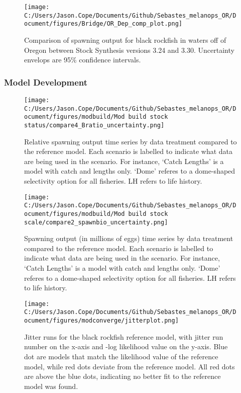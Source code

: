 \documentclass[11pt,
  english,
  letterpaper,
]{article}
\begin{document}
\newpage

\begin{figure}
\centering
\texttt{[image: C:/Users/Jason.Cope/Documents/Github/Sebastes\_melanops\_OR/Document/figures/Bridge/OR\_Dep\_comp\_plot.png]}
\caption{Comparison of spawning output for black rockfish in waters off of Oregon between Stock Synthesis versions 3.24 and 3.30. Uncertainty envelops are 95\% confidence intervals.\label{fig:deps-bridge-comps}}
\end{figure}

\clearpage

\hypertarget{model-development}{%
\subsubsection{Model Development}\label{model-development}}

\begin{figure}
\centering
\texttt{[image: C:/Users/Jason.Cope/Documents/Github/Sebastes\_melanops\_OR/Document/figures/modbuild/Mod build stock status/compare4\_Bratio\_uncertainty.png]}
\caption{Relative spawning output time series by data treatment compared to the reference model. Each scenario is labelled to indicate what data are being used in the scenario. For instance, `Catch Lengths' is a model with catch and lengths only. `Dome' referes to a dome-shaped selectivity option for all fisheries. LH refers to life history.\label{fig:modbuild-data-depl}}
\end{figure}

\newpage

\begin{figure}
\centering
\texttt{[image: C:/Users/Jason.Cope/Documents/Github/Sebastes\_melanops\_OR/Document/figures/modbuild/Mod build stock scale/compare2\_spawnbio\_uncertainty.png]}
\caption{Spawning output (in millions of eggs) time series by data treatment compared to the reference model. Each scenario is labelled to indicate what data are being used in the scenario. For instance, `Catch Lengths' is a model with catch and lengths only. `Dome' referes to a dome-shaped selectivity option for all fisheries. LH refers to life history.\label{fig:modbuild-data-ssb}}
\end{figure}

\newpage

\begin{figure}
\centering
\texttt{[image: C:/Users/Jason.Cope/Documents/Github/Sebastes\_melanops\_OR/Document/figures/modconverge/jitterplot.png]}
\caption{Jitter runs for the black rockfish reference model, with jitter run number on the x-axis and -log likelihood value on the y-axis. Blue dot are models that match the likelihood value of the reference model, while red dots deviate from the reference model. All red dots are above the blue dots, indicating no better fit to the reference model was found.\label{fig:jitter}}
\end{figure}
\end{document}
